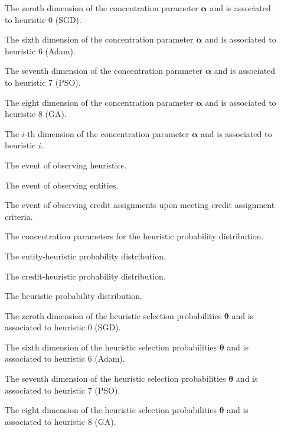 \begin{description}
	\item [\parbox{2cm}{$\alpha_{0}$}] The zeroth dimension of the concentration parameter $\boldsymbol{\alpha}$ and is associated to heuristic $0$ (\acs{SGD}).
	\item [\parbox{2cm}{$\alpha_{6}$}] The sixth dimension of the concentration parameter $\boldsymbol{\alpha}$ and is associated to heuristic $6$ (\acs{Adam}).
	\item [\parbox{2cm}{$\alpha_{7}$}] The seventh dimension of the concentration parameter $\boldsymbol{\alpha}$ and is associated to heuristic $7$ (\acs{PSO}).
	\item [\parbox{2cm}{$\alpha_{8}$}] The eight dimension of the concentration parameter $\boldsymbol{\alpha}$ and is associated to heuristic $8$ (\acs{GA}).
	\item [\parbox{2cm}{$\alpha_{i}$}] The $i$-th dimension of the concentration parameter $\boldsymbol{\alpha}$ and is associated to heuristic $i$.
	\item [\parbox{2cm}{$\boldsymbol{H}$}] The event of observing heuristics.
	\item [\parbox{2cm}{$\boldsymbol{E}$}] The event of observing entities.
	\item [\parbox{2cm}{$\boldsymbol{C}$}] The event of observing credit assignments upon meeting credit assignment criteria.
	\item [\parbox{2cm}{$\boldsymbol{\alpha}$}] The concentration parameters for the heuristic probability distribution.
	\item [\parbox{2cm}{$\boldsymbol{\phi}$}] The entity-heuristic probability distribution.
	\item [\parbox{2cm}{$\boldsymbol{\psi}$}] The credit-heuristic probability distribution.
	\item [\parbox{2cm}{$\boldsymbol{\theta}$}] The heuristic probability distribution.
	\item [\parbox{2cm}{$\theta_{0}$}] The zeroth dimension of the heuristic selection probabilities $\boldsymbol{\theta}$ and is associated to heuristic $0$ (\acs{SGD}).
	\item [\parbox{2cm}{$\theta_{6}$}] The sixth dimension of the heuristic selection probabilities $\boldsymbol{\theta}$ and is associated to heuristic $6$ (\acs{Adam}).
	\item [\parbox{2cm}{$\theta_{7}$}] The seventh dimension of the heuristic selection probabilities $\boldsymbol{\theta}$ and is associated to heuristic $7$ (\acs{PSO}).
	\item [\parbox{2cm}{$\theta_{8}$}] The eight dimension of the heuristic selection probabilities $\boldsymbol{\theta}$ and is associated to heuristic $8$ (\acs{GA}).

\end{description}
